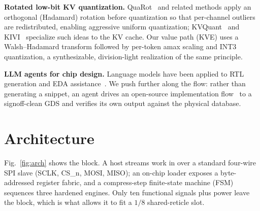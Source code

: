 \documentclass[conference]{IEEEtran}
\begin{document}
\noindent\textbf{Rotated low-bit KV quantization.} QuaRot~\cite{quarot} and
related methods apply an orthogonal (Hadamard) rotation before quantization so
that per-channel outliers are redistributed, enabling aggressive uniform
quantization; KVQuant~\cite{kvquant} and KIVI~\cite{kivi} specialize such ideas to
the KV cache. Our value path (KVE) uses a Walsh--Hadamard transform followed by
per-token amax scaling and INT3 quantization, a synthesizable, division-light
realization of the same principle.

\noindent\textbf{LLM agents for chip design.} Language models have been applied to
RTL generation and EDA assistance~\cite{chipnemo}. We push further along the flow:
rather than generating a snippet, an agent drives an open-source
implementation flow~\cite{openlane} to a signoff-clean GDS and verifies its own
output against the physical database.

\section{Architecture}
\label{sec:arch}
Fig.~\ref{fig:arch} shows the block. A host streams work in over a standard
four-wire SPI slave (SCLK, CS\_n, MOSI, MISO); an on-chip loader exposes a
byte-addressed register fabric, and a compress-step finite-state machine (FSM)
sequences three hardened engines. Only ten functional signals plus power leave
the block, which is what allows it to fit a $1/8$ shared-reticle slot.
\end{document}
